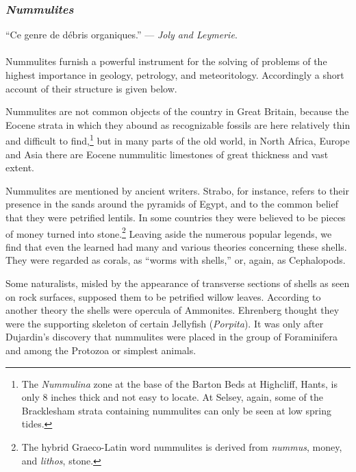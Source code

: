 \documentclass[a4paper, 12pt, oneside, landscape]{article}
\begin{document}
\subsubsection{\emph{Nummulites}}
\begin{displayquote}
``Ce genre de débris organiques.'' --- \emph{Joly and Leymerie}.
\end{displayquote}
\paragraph{}
Nummulites furnish a powerful instrument for the solving of problems of the highest importance in geology, petrology, and meteoritology. Accordingly a short account of their structure is given below.

Nummulites are not common objects of the country in Great Britain, because the Eocene strata in which they abound as recognizable fossils are here relatively thin and difficult to find,\footnote{The \emph{Nummulina} zone at the base of the Barton Beds at Highcliff, Hants, is only 8 inches thick and not easy to locate. At Selsey, again, some of the Bracklesham strata containing nummulites can only be seen at low spring tides.} but in many parts of the old world, in North Africa, Europe and Asia there are Eocene nummulitic limestones of great thickness and vast extent.

Nummulites are mentioned by ancient writers. Strabo, for instance, refers to their presence in the sands around the pyramids of Egypt, and to the common belief that they were petrified lentils. In some countries they were believed to be pieces of money turned into stone.\footnote{The hybrid Graeco-Latin word nummulites is derived from \emph{nummus}, money, and \emph{lithos}, stone.} Leaving aside the numerous popular legends, we find that even the learned had many and various theories concerning these shells. They were regarded as corals, as ``worms with shells,'' or, again, as Cephalopods.

Some naturalists, misled by the appearance of transverse sections of shells as seen on rock surfaces, supposed them to be petrified willow leaves. According to another theory the shells were opercula of Ammonites. Ehrenberg thought they were the supporting skeleton of certain Jellyfish (\emph{Porpita}). It was only after Dujardin's discovery that nummulites were placed in the group of Foraminifera and among the Protozoa or simplest animals.
\end{document}
